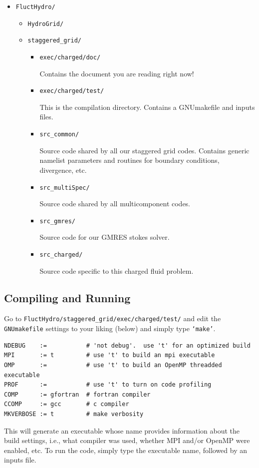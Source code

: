 \documentclass[final]{siamltex}
\begin{document}
\begin{itemize}

\item {\tt FluctHydro/}

\begin{itemize}

\item {\tt HydroGrid/}

\item {\tt staggered\_grid/}

\begin{itemize}

\item {\tt exec/charged/doc/}

Contains the document you are reading right now!

\item {\tt exec/charged/test/}

This is the compilation directory.  Contains a GNUmakefile and inputs files.

\item {\tt src\_common/}

Source code shared by all our staggered grid codes.  Contains generic namelist parameters
and routines for boundary conditions, divergence, etc.

\item {\tt src\_multiSpec/}

Source code shared by all multicomponent codes.

\item {\tt src\_gmres/}

Source code for our GMRES stokes solver.

\item {\tt src\_charged/}

Source code specific to this charged fluid problem.

\end{itemize}
\end{itemize}
\end{itemize}

\subsection{Compiling and Running}
Go to {\tt FluctHydro/staggered\_grid/exec/charged/test/} and edit the 
{\tt GNUmakefile} settings to your liking (below) and simply type {\tt `make'}.\\
\begin{verbatim}
NDEBUG    :=           # 'not debug'.  use 't' for an optimized build
MPI       := t         # use 't' to build an mpi executable
OMP       :=           # use 't' to build an OpenMP threadded executable
PROF      :=           # use 't' to turn on code profiling
COMP      := gfortran  # fortran compiler
CCOMP     := gcc       # c compiler
MKVERBOSE := t         # make verbosity

\end{verbatim}
This will generate an executable whose name provides information about the build settings,
i.e., what compiler was used, whether MPI and/or OpenMP were enabled, etc.
To run the code, simply type the executable name, followed by an inputs file.
\end{document}
